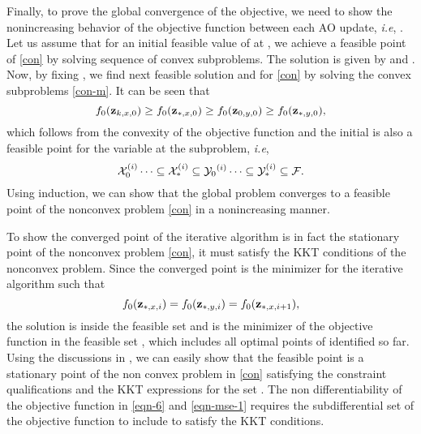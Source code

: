 Finally, to prove the global convergence of the objective, we need to show the nonincreasing behavior of the objective function between each \ac{AO} update, \textit{i.e}, . Let us assume that for an initial feasible value of \eqn{\my} at , we achieve a feasible point of \eqref{con} by solving sequence of convex subproblems. The solution is given by  and \eqn{\mx_{\ast}}. Now, by fixing , we find next feasible solution  and \eqn{\my_{\ast}} for \eqref{con} by solving the convex subproblems \eqref{con-m}. It can be seen that 
\begin{equation}
f_0(\mathbf{z}_{k,x,0}) \geq f_0(\mathbf{z}_{\ast,x,0}) \geq f_0(\mathbf{z}_{0,y,0}) \geq f_0(\mathbf{z}_{\ast,y,0}),
\end{equation}
which follows from the convexity of the objective function  and the initial  is also a feasible point for the variable \eqn{\my} at the  subproblem, \textit{i.e}, 
\begin{equation}
{\mathcal{X}}^{(i)}_{0} \dots \subseteq {\mathcal{X}}^{(i)}_{\ast} \subseteq {\mathcal{Y}_{0}}^{(i)} \dots \subseteq {\mathcal{Y}}^{(i)}_{\ast} \subseteq \mathcal{F}.
\end{equation}
Using induction, we can show that the global problem converges to a feasible point of the nonconvex problem \eqref{con} in a nonincreasing manner.

To show the converged point of the iterative algorithm is in fact the stationary point of the nonconvex problem \eqref{con}, it must satisfy the \ac{KKT} conditions of the nonconvex problem. Since the converged point is the minimizer for the iterative algorithm such that 
\begin{equation} \label{con-opt}
f_0(\mz_{\ast,x,i}) = f_0(\mz_{\ast,y,i}) = f_0(\mz_{\ast,x,i+1}),
\end{equation}
the solution is inside the feasible set  and  is the minimizer of the objective function  in the feasible set , which includes all optimal points of \me{\mz} identified so far. Using the discussions in \cite{marks1978technical}, we can easily show that the feasible point  is a stationary point of the non convex problem in \eqref{con} satisfying the constraint qualifications and the \ac{KKT} expressions for the set . The non differentiability of the objective function in \eqref{eqn-6} and \eqref{eqn-mse-1} requires the subdifferential set of the objective function to include  to satisfy the \ac{KKT} conditions.

